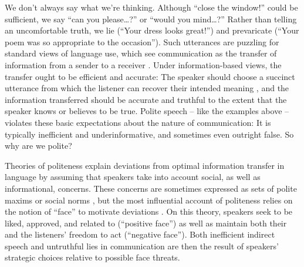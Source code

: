 \documentclass[12pt]{article}
\begin{document}


We don't always say what we're thinking. Although \enquote{close the
window!} could be sufficient, we say \enquote{can you please\ldots{}?}
or \enquote{would you mind\ldots{}?} Rather than telling an
uncomfortable truth, we lie (\enquote{Your dress looks great!}) and
prevaricate (\enquote{Your poem was so appropriate to the occasion}).
Such utterances are puzzling for standard views of language use, which
see communication as the transfer of information from a sender to a
receiver \cite{buhler1934, shannon1948, jakobson1960, frank2012}. Under
information-based views, the transfer ought to be efficient and
accurate: The speaker should choose a succinct utterance from which the
listener can recover their intended meaning  \cite{grice1975, searle1975},
and the information transferred should be accurate and truthful to the
extent that the speaker knows or believes to be true. Polite speech --
like the examples above -- violates these basic expectations about the
nature of communication: It is typically inefficient and
underinformative, and sometimes even outright false. So why are we
polite?

Theories of politeness explain deviations from optimal information
transfer in language by assuming that speakers take into account social,
as well as informational, concerns. These concerns are sometimes
expressed as sets of polite maxims \cite{leech1983} or social norms \cite{ide1989}, 
but the most influential account of politeness relies on the
notion of \enquote{face} to motivate deviations \cite{brown1987, goffman1967}. 
On this theory, speakers seek to be liked,
approved, and related to (\enquote{positive face}) as well as maintain
both their and the listeners' freedom to act (\enquote{negative face}).
Both inefficient indirect speech and untruthful lies in communication
are then the result of speakers' strategic choices relative to possible
face threats.
\end{document}

